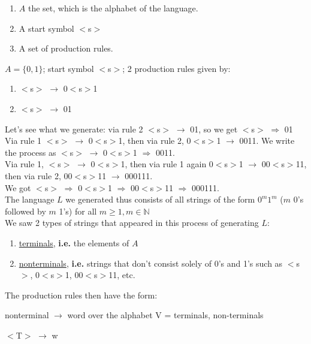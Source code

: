 \documentclass[10pt]{article}
\begin{document}
\begin{description}
		\begin{enumerate}
			\item $A$ the set, which is the alphabet of the language.
			\item A start symbol $<$s$>$
			\item A set of production rules.
		\end{enumerate}
		\item[Example:] $A = \{0, 1\}$; start symbol $<$s$>$; 2 production rules given by:
		\begin{enumerate}
			\item $<$s$>$ $\rightarrow$ 0$<$s$>$1
			\item $<$s$>$ $\rightarrow$ 01
		\end{enumerate}
		Let's see what we generate: via rule 2 \hspace{5mm} $<$s$>$ $\rightarrow$ 01, so we get $<$s$>$ $\Rightarrow$ 01 \\
		Via rule 1 \hspace{5mm} $<$s$>$ $\rightarrow$ 0$<$s$>$1, then via rule 2, 0$<$s$>$1 $\rightarrow$ 0011. We write the process as $<$s$>$ $\rightarrow$ 0$<$s$>$1 $\Rightarrow$ 0011. \\
		Via rule 1, $<$s$>$ $\rightarrow$ 0$<$s$>$1, then via rule 1 again 0$<$s$>$1 $\rightarrow$ 00$<$s$>$11, then via rule 2, 00$<$s$>$11 $\rightarrow$ 000111. \\
		We got $<$s$>$ $\Rightarrow$ 0$<$s$>$1 $\Rightarrow$ 00$<$s$>$11 $\Rightarrow$ 000111. \\
		The language $L$ we generated thus consists of all strings of the form $0^m1^m$ ($m$ 0's followed by $m$ 1's) for all $m \geq 1, m \in \mathbb{N}$ \\
		We saw 2 types of strings that appeared in this process of generating $L$:
		\begin{enumerate}
			\item \underline{terminals}, \textbf{i.e.} the elements of $A$
			\item \underline{nonterminals}, \textbf{i.e.} strings that don't consist solely of 0's and 1's such as $<$s$>$, 0$<$s$>$1, 00$<$s$>$11, etc.
		\end{enumerate}
		The production rules then have the form:
		\begin{description}
			\item nonterminal $\rightarrow$ word over the alphabet V = {terminals, non-terminals}
			\item $<$T$>$ $\rightarrow$ w
		\end{description}

\end{description}
\end{document}
